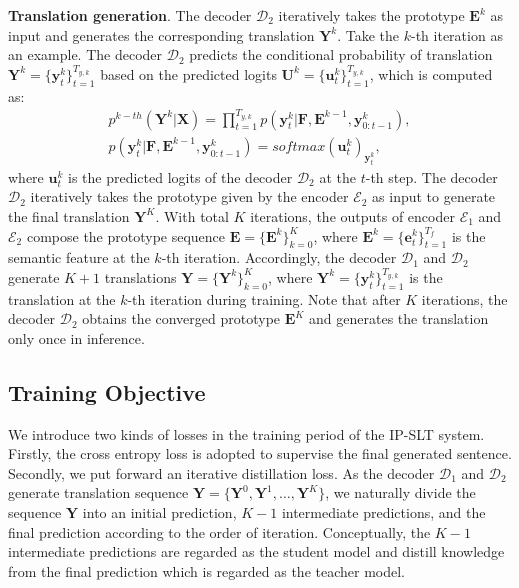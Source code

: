 \documentclass[10pt,twocolumn,letterpaper]{article}
\begin{document}
    \smallskip
    \noindent \textbf{Translation generation}.
    The decoder $\mathcal{D}_2$ iteratively takes the prototype $\bm{E}^k$ as input and generates the corresponding translation $\bm{Y}^k$. Take the $k$-th iteration as an example. 
    The decoder $\mathcal{D}_2$ predicts the conditional probability of translation $\bm{Y}^k=\{\bm{y}^k_t\}_{t=1}^{T_{y,k}}$ based on the predicted logits $\bm{U}^k=\{\bm{u}^k_t\}_{t=1}^{T_{y,k}}$, which is computed as:\vspace{-1mm}
    \begin{equation}
    \begin{aligned}
    \label{equ:6}
    p^{k-th}(\bm{Y}^k|\bm{X})=\prod_{t=1}^{T_{y,k}}p(\bm{y}^k_t|\bm{F},\bm{E}^{k-1}, \bm{y}^k_{0:t-1}),\\
    p(\bm{y}^k_t|\bm{F},\bm{E}^{k-1}, \bm{y}^k_{0:t-1})=softmax(\bm{u}^k_t)_{\bm{y}^k_t},
    \end{aligned}
    \end{equation}\vspace{-1mm}
    where $\bm{u}^k_t$ is the predicted logits of the decoder $\mathcal{D}_2$ at the $t$-th step.
    The decoder $\mathcal{D}_2$ iteratively takes the prototype given by the encoder $\mathcal{E}_2$ as input to generate the final translation $\bm{Y}^K$. With total $K$ iterations, the outputs of encoder $\mathcal{E}_1$ and $\mathcal{E}_2$ compose the prototype sequence $\bm{E}=\{\bm{E}^k\}_{k=0}^K$, where $\bm{E}^k=\{\bm{e}_t^k\}_{t=1}^{T_f}$ is the semantic feature at the $k$-th iteration. Accordingly, the decoder $\mathcal{D}_1$ and $\mathcal{D}_2$ generate $K+1$ translations $\bm{Y}=\{\bm{Y}^k\}_{k=0}^K$, where $\bm{Y}^k=\{\bm{y}_t^k\}_{t=1}^{T_{y,k}}$ is the translation at the $k$-th iteration during training. Note that after $K$ iterations, the decoder $\mathcal{D}_2$ obtains the converged prototype $\bm{E}^K$ and generates the translation only once in inference. 
    
    \subsection{Training Objective}
    We introduce two kinds of losses in the training period of the IP-SLT system.
    Firstly, the cross entropy loss is adopted to supervise the final generated sentence.
    Secondly, we put forward an iterative distillation loss. As the decoder $\mathcal{D}_1$ and $\mathcal{D}_2$ generate translation sequence $\bm{Y}=\{\bm{Y}^0,\bm{Y}^1,\dots,\bm{Y}^K\}$, we naturally divide the sequence $\bm{Y}$ into an initial prediction, $K-1$ intermediate predictions, and the final prediction according to the order of iteration. 
    Conceptually, the $K-1$ intermediate predictions are regarded as the student model and distill knowledge from the final prediction which is regarded as the teacher model. 
\end{document}
